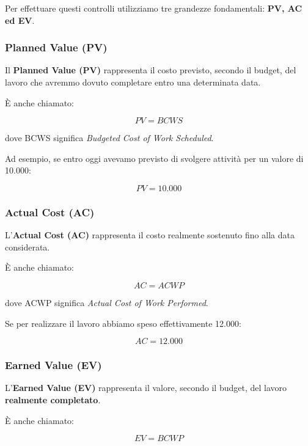 \noindent Per effettuare questi controlli
utilizziamo tre grandezze fondamentali:
\textbf{PV, AC ed EV}.


\subsubsection*{Planned Value (PV)}

\noindent Il \textbf{Planned Value (PV)}
rappresenta il costo previsto,
secondo il budget, del lavoro
che avremmo dovuto completare
entro una determinata data.

\medskip

\noindent È anche chiamato:

\[
\boxed{
PV=BCWS
}
\]

\noindent dove BCWS significa
\textit{Budgeted Cost of Work Scheduled}.

\medskip

\noindent Ad esempio, se entro oggi
avevamo previsto di svolgere
attività per un valore di 10.000:

\[
\boxed{PV=10.000}
\]


\subsubsection*{Actual Cost (AC)}

\noindent L'\textbf{Actual Cost (AC)}
rappresenta il costo realmente
sostenuto fino alla data considerata.

\medskip

\noindent È anche chiamato:

\[
\boxed{
AC=ACWP
}
\]

\noindent dove ACWP significa
\textit{Actual Cost of Work Performed}.

\medskip

\noindent Se per realizzare il lavoro
abbiamo speso effettivamente 12.000:

\[
\boxed{AC=12.000}
\]


\subsubsection*{Earned Value (EV)}

\noindent L'\textbf{Earned Value (EV)}
rappresenta il valore, secondo il budget,
del lavoro \textbf{realmente completato}.

\medskip

\noindent È anche chiamato:

\[
\boxed{
EV=BCWP
}
\]

